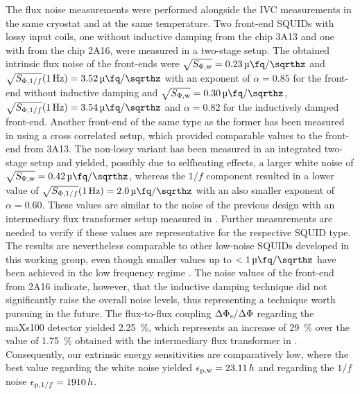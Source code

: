 The flux noise measurements were performed alongside the IVC measurements in the same cryostat and at the same temperature. Two front-end SQUIDs with lossy input coils, one without inductive damping from the chip 3A13 and one with from the chip 2A16, were measured in a two-stage setup. The obtained intrinsic flux noise of the front-ends were  $\sqrt{S_{\rm \Phi,w}}=\qty{0.23}{\micro\fq\per\sqrthz}$ and $\sqrt{S_{{\rm \Phi},1/f}}(\qty{1}{\Hz})=\qty{3.52}{\micro\fq\per\sqrthz}$ with an exponent of $\alpha=0.85$ for the front-end without inductive damping and $\sqrt{S_{\rm \Phi,w}}=\qty{0.30}{\micro\fq\per\sqrthz}$, $\sqrt{S_{{\rm \Phi},1/f}}(\qty{1}{\Hz})=\qty{3.54}{\micro\fq\per\sqrthz}$ and $\alpha=0.82$ for the inductively damped front-end. Another front-end of the same type as the former has been measured in \cite{Mazibrada2024} using a cross correlated setup, which provided comparable values to the front-end from 3A13. The non-lossy variant has been measured in an integrated two-stage setup and yielded, possibly due to selfheating effects, a larger white noise of $\sqrt{S_{\rm \Phi,w}}=\qty{0.42}{\micro\fq\per\sqrthz}$, whereas the $1/f$ component resulted in a lower value of $\sqrt{S_{{\rm \Phi},1/f}}(\qty{1}{\Hz})=\qty{2.0}{\micro\fq\per\sqrthz}$ with an also smaller exponent of $\alpha=0.60$. These values are similar to the noise of the previous design with an intermediary flux transformer setup measured in \cite{Bauer2022}. Further measurements are needed to verify if these values are representative for the respective SQUID type. The results are nevertheless comparable to other low-noise SQUIDs developed in this working group, even though smaller values up to $<\qty{1}{\micro\fq\per\sqrthz}$ have been achieved in the low frequency regime \cite{Ferring2015}. The noise values of the front-end from 2A16 indicate, however, that the inductive damping technique did not significantly raise the overall noise levels, thus representing a technique worth pursuing in the future. The flux-to-flux coupling $\Delta\Phi_{\rm s}/\Delta\Phi$ regarding the maXs100 detector yielded \qty{2.25}{\percent}, which represents an increase of \qty{29}{\percent} over the value of \qty{1.75}{\percent} obtained with the intermediary flux transformer in \cite{Bauer2022}. Consequently, our extrinsic energy sensitivities are comparatively low, where the best value regarding the white noise yielded $\epsilon_{\rm p,w}=23.11\, h$ and regarding the $1/f$ noise $\epsilon_{{\rm p}, 1/f}=1910\, h$.

